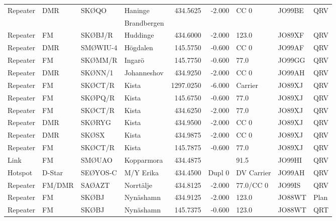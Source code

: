 \begin{longtable}{llllrrlll}
Repeater & DMR         & SKØQO    & Haninge     & 434.5625     & -2.000     & CC 0       & JO99BE      & QRV      \\
         &             &          & Brandbergen &              &            &            &             &          \\
Repeater & FM          & SKØBJ/R  & Huddinge    & 434.6000     & -2.000     & 123.0      & JO89XF      & QRV      \\
Repeater & DMR         & SMØWIU-4 & Högdalen    & 145.5750     & -0.600     & CC 0       & JO99AF      & QRV      \\
Repeater & FM          & SKØMM/R  & Ingarö      & 145.7750     & -0.600     & 77.0       & JO99GG      & QRV      \\
Repeater & DMR         & SKØNN/1  & Johanneshov & 434.9250     & -2.000     & CC 0       & JO99AH      & QRV      \\
Repeater & FM          & SKØCT/R  & Kista       & 1297.0250    & -6.000     & Carrier    & JO89XJ      & QRV      \\
Repeater & FM          & SKØPQ/R  & Kista       & 145.6750     & -0.600     & 77.0       & JO89XJ      & QRV      \\
Repeater & FM          & SKØCT/R  & Kista       & 434.6250     & -2.000     & 77.0       & JO89XJ      & QRV      \\
Repeater & DMR         & SKØRYG   & Kista       & 434.9500     & -2.000     & CC 0       & JO89XJ      & QRV      \\
Repeater & DMR         & SKØSX    & Kista       & 434.9875     & -2.000     & CC 0       & JO89XJ      & QRV      \\
Repeater & FM          & SKØCT/R  & Kista       & 145.7875     & -0.600     & 77.0       & JO89XJ      & QRV      \\
Link     & FM          & SMØUAO   & Kopparmora  & 434.4875     &            & 91.5       & JO99HI      & QRV      \\
Hotspot  & D-Star      & SEØYOS-C & M/Y Erika   & 434.4500     & Dupl 0     & DV Carrier & JO99AH      & QRV      \\
Repeater & FM/DMR      & SAØAZT   & Norrtälje   & 434.8125     & -2.000     & 77.0/CC 0  & JO99IS      & QRV      \\
Repeater & FM          & SKØBJ    & Nynäshamn   & 434.9125     & -2.000     & 123.0      & JO88WT      & Plan     \\
Repeater & FM          & SKØBJ    & Nynäshamn   & 145.7375     & -0.600     & 123.0      & JO88WT      & QRT      \\

\end{longtable}
